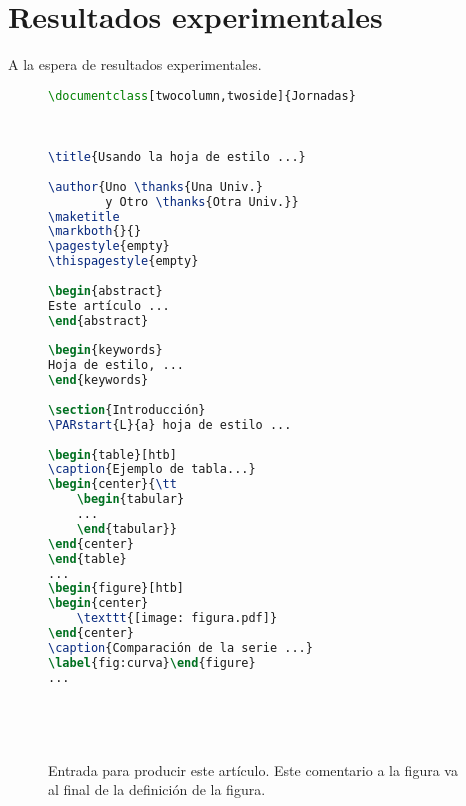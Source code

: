 \section{Resultados experimentales}

A la espera de resultados experimentales.


\begin{figure}[!t]
    \centering
    \begin{minipage}{0.9\linewidth}
    {\footnotesize
    \begin{lstlisting}[language=TeX]
\documentclass[twocolumn,twoside]{Jornadas}  

 
    
\title{Usando la hoja de estilo ...} 
    
\author{Uno \thanks{Una Univ.}
        y Otro \thanks{Otra Univ.}} 
\maketitle
\markboth{}{}
\pagestyle{empty} 
\thispagestyle{empty}
    
\begin{abstract} 
Este artículo ... 
\end{abstract} 
    
\begin{keywords} 
Hoja de estilo, ... 
\end{keywords} 
    
\section{Introducción} 
\PARstart{L}{a} hoja de estilo ... 
    
\begin{table}[htb] 
\caption{Ejemplo de tabla...} 
\begin{center}{\tt 
    \begin{tabular} 
    ... 
    \end{tabular}} 
\end{center} 
\end{table} 
... 
\begin{figure}[htb] 
\begin{center} 
    \texttt{[image: figura.pdf]} 
\end{center} 
\caption{Comparación de la serie ...} 
\label{fig:curva}\end{figure} 
... 

 
 
 
    \end{lstlisting}
    }
    \end{minipage}
    \caption{Entrada para producir este artículo. Este comentario a la figura 
    va al final de la definición de la figura.}
    \label{fig:programa}
    \end{figure}